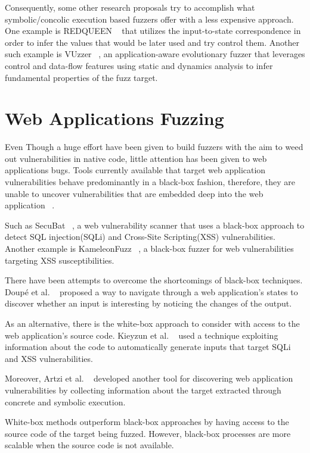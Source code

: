 Consequently, some other research proposals try to accomplish what symbolic/concolic execution based fuzzers offer with a less expensive approach. One example is REDQUEEN ~\cite{aschermann2019redqueen} that utilizes the input-to-state correspondence in order to infer the values that would be later used and try control them. Another such example is VUzzer ~\cite{rawat2017vuzzer}, an application-aware evolutionary fuzzer that leverages control and data-flow features using static and dynamics analysis to infer fundamental properties of the fuzz target.

\section{Web Applications Fuzzing}
Even Though a huge effort have been given to build fuzzers with the aim to weed out vulnerabilities in native code, little attention has been given to web applications bugs. Tools currently available that target web application vulnerabilities behave predominantly in a black-box fashion, therefore, they are unable to uncover vulnerabilities that are embedded deep into the web application ~\cite{bau2010state, doupe2010johnny}.
 
Such as SecuBat ~\cite{kals2006secubat}, a web vulnerability scanner that uses a black-box approach to detect SQL injection(SQLi) and Cross-Site Scripting(XSS) vulnerabilities. Another example is KameleonFuzz ~\cite{duchene2014kameleonfuzz}, a black-box fuzzer for web vulnerabilities targeting XSS susceptibilities.

There have been attempts to overcome the shortcomings of black-box techniques. Doupé et al. ~\cite{doupe2012enemy} proposed a way to navigate through a web application's states to discover whether an input is interesting by noticing the changes of the output. 

As an alternative, there is the white-box approach to consider with access to the web application's source code. Kieyzun et al. ~\cite{kieyzun2009automatic} used a technique exploiting information about the code to automatically generate inputs that target SQLi and XSS vulnerabilities. 

Moreover, Artzi et al. ~\cite{artzi2010finding} developed another tool for discovering web
application vulnerabilities by collecting information about the target extracted through concrete and symbolic execution.

White-box methods outperform black-box approaches by having access to the source code of the target being fuzzed. However, black-box processes are more scalable when the source code is not 
available. 

